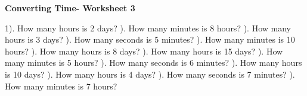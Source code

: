 \documentclass{article}%
\begin{document}
\pagebreak%
\large%
\begin{center}%
\textbf{Converting Time- Worksheet 3}%
\newline%
\end{center} \normalsize%
1). How many hours is 2 days?%
\newline%
\newline%
). How many minutes is 8 hours?%
\newline%
\newline%
). How many hours is 3 days?%
\newline%
\newline%
). How many seconds is 5 minutes?%
\newline%
\newline%
). How many minutes is 10 hours?%
\newline%
\newline%
). How many hours is 8 days?%
\newline%
\newline%
). How many hours is 15 days?%
\newline%
\newline%
). How many minutes is 5 hours?%
\newline%
\newline%
). How many seconds is 6 minutes?%
\newline%
\newline%
). How many hours is 10 days?%
\newline%
\newline%
). How many hours is 4 days?%
\newline%
\newline%
). How many seconds is 7 minutes?%
\newline%
\newline%
). How many minutes is 7 hours?%
\newline%
\newline%
\newline%
\end{document}

